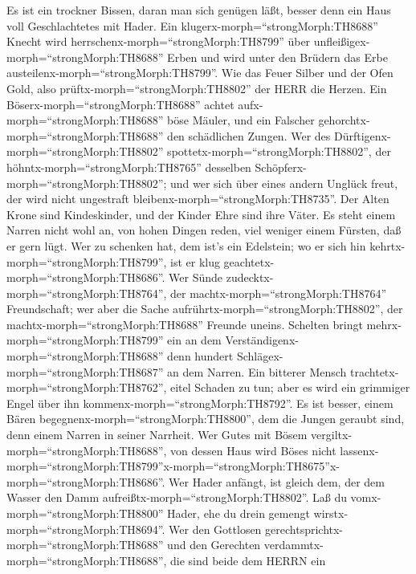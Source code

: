  Es ist ein trockner Bissen, daran man sich genügen läßt,
besser denn ein Haus voll Geschlachtetes mit Hader.  Ein
klugerx-morph=``strongMorph:TH8688'' Knecht wird
herrschenx-morph=``strongMorph:TH8799'' über
unfleißigex-morph=``strongMorph:TH8688'' Erben und wird unter den
Brüdern das Erbe austeilenx-morph=``strongMorph:TH8799''. 
Wie das Feuer Silber und der Ofen Gold, also
prüftx-morph=``strongMorph:TH8802'' der HERR die Herzen. 
Ein Böserx-morph=``strongMorph:TH8688'' achtet
aufx-morph=``strongMorph:TH8688'' böse Mäuler, und ein Falscher
gehorchtx-morph=``strongMorph:TH8688'' den schädlichen Zungen.
 Wer des Dürftigenx-morph=``strongMorph:TH8802''
spottetx-morph=``strongMorph:TH8802'', der
höhntx-morph=``strongMorph:TH8765'' desselben
Schöpferx-morph=``strongMorph:TH8802''; und wer sich über eines andern
Unglück freut, der wird nicht ungestraft
bleibenx-morph=``strongMorph:TH8735''.  Der Alten Krone sind
Kindeskinder, und der Kinder Ehre sind ihre Väter.  Es steht
einem Narren nicht wohl an, von hohen Dingen reden, viel weniger einem
Fürsten, daß er gern lügt.  Wer zu schenken hat, dem ist's
ein Edelstein; wo er sich hin kehrtx-morph=``strongMorph:TH8799'', ist
er klug geachtetx-morph=``strongMorph:TH8686''.  Wer Sünde
zudecktx-morph=``strongMorph:TH8764'', der
machtx-morph=``strongMorph:TH8764'' Freundschaft; wer aber die Sache
aufrührtx-morph=``strongMorph:TH8802'', der
machtx-morph=``strongMorph:TH8688'' Freunde uneins. 
Schelten bringt mehrx-morph=``strongMorph:TH8799'' ein an dem
Verständigenx-morph=``strongMorph:TH8688'' denn hundert
Schlägex-morph=``strongMorph:TH8687'' an dem Narren.  Ein
bitterer Mensch trachtetx-morph=``strongMorph:TH8762'', eitel Schaden zu
tun; aber es wird ein grimmiger Engel über ihn
kommenx-morph=``strongMorph:TH8792''.  Es ist besser, einem
Bären begegnenx-morph=``strongMorph:TH8800'', dem die Jungen geraubt
sind, denn einem Narren in seiner Narrheit.  Wer Gutes mit
Bösem vergiltx-morph=``strongMorph:TH8688'', von dessen Haus wird Böses
nicht
lassenx-morph=``strongMorph:TH8799''\textbar x-morph=``strongMorph:TH8675''x-morph=``strongMorph:TH8686''.
 Wer Hader anfängt, ist gleich dem, der dem Wasser den Damm
aufreißtx-morph=``strongMorph:TH8802''. Laß du
vomx-morph=``strongMorph:TH8800'' Hader, ehe du drein gemengt
wirstx-morph=``strongMorph:TH8694''.  Wer den Gottlosen
gerechtsprichtx-morph=``strongMorph:TH8688'' und den Gerechten
verdammtx-morph=``strongMorph:TH8688'', die sind beide dem HERRN ein
